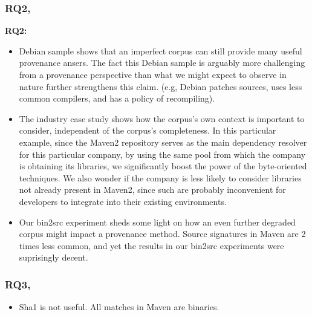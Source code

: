\subsubsection{RQ2, \rqTwo}

\begin{hassanbox}
\textbf{RQ2:}  

\begin{itemize}


\item Debian sample shows that an imperfect corpus can still provide many useful provenance ansers.
      The fact this Debian sample is arguably more challenging from a provenance perspective
      than what we might expect to observe in nature further strengthens this claim.
      (e.g, Debian patches sources, uses less common compilers, and has a policy of recompiling).

\item The industry case study shows how the corpus's own context is important to consider,
      independent of the corpus's completeness.
      In this particular example, since the Maven2 repository serves as the main dependency
      resolver for this particular company, by using the same pool from which the company is obtaining
      its libraries, we significantly boost the power of the byte-oriented techniques.
      We also wonder if the company is less likely to consider libraries not already present in Maven2,
      since such are probably inconvenient for developers to integrate into their existing environments.
                                                                   
\item Our bin2src experiment sheds some light on how an even further degraded corpus might
      impact a provenance method.  Source signatures in Maven are 2 times less common, and
      yet the results in our bin2src experiments were suprisingly decent.

\end{itemize}

\end{hassanbox}



\subsubsection{RQ3, \rqThree}

\begin{itemize}
\item Sha1 is not useful. All matches in Maven are binaries.
\end{itemize}

